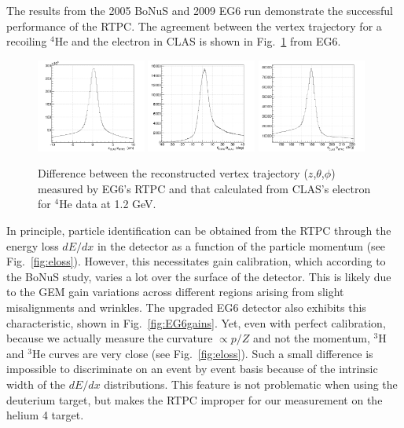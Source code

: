 The results from the 2005 BoNuS and 2009 EG6 run demonstrate the successful 
performance of the RTPC. The agreement between the vertex trajectory for a 
recoiling $^4$He and the electron in CLAS is shown in 
Fig.~\ref{fig:EG6elastic_delta} from EG6.  

\begin{figure}
  \begin{center}
    \includegraphics[angle=0, width=0.32\textwidth]{./../Detector/fig-chap2/eg6elastic_dz_small}
    \includegraphics[angle=0, width=0.32\textwidth]{./../Detector/fig-chap2/eg6elastic_dthe_small}
    \includegraphics[angle=0, width=0.32\textwidth]{./../Detector/fig-chap2/eg6elastic_dphi_small}
    \caption{Difference between the reconstructed vertex trajectory ($z$,$\theta$,$\phi$) measured by EG6's RTPC and that calculated from CLAS's electron for $^4$He data at 1.2 GeV.\label{fig:EG6elastic_delta}}
  \end{center}
\end{figure}


In principle, particle identification can be obtained from the RTPC through the 
energy loss $dE/dx$ in the detector as a function of the particle momentum (see 
Fig.~\ref{fig:eloss}). However, this necessitates gain calibration, which 
according to the BoNuS study, varies a lot over the surface of the detector.  
This is likely due to the GEM gain variations across different regions arising 
from slight misalignments and wrinkles. The upgraded EG6 detector also exhibits 
this characteristic, shown in Fig.~\ref{fig:EG6gains}. Yet, even with perfect 
calibration, because we actually measure the curvature $\propto p/Z$ and not 
the momentum, $^3$H and $^3$He curves are very close (see 
Fig.~\ref{fig:eloss}). Such a small difference is impossible to discriminate on 
an event by event basis because of the intrinsic width of the $dE/dx$ 
distributions. This feature is not problematic when using the deuterium target, 
but makes the RTPC improper for our measurement on the helium 4 target.


